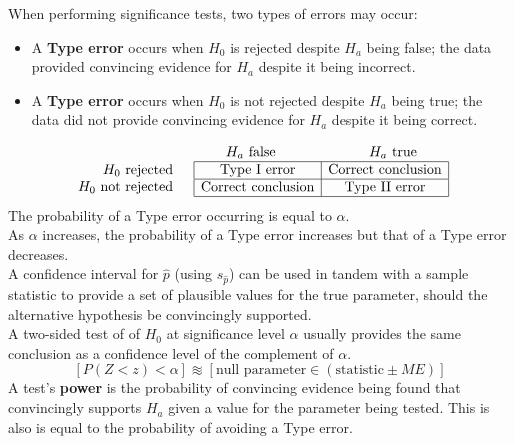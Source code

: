 \documentclass[../AP_Statistics.tex]{subfiles}
\begin{document}
		When performing significance tests, two types of errors may occur:
		\begin{itemize}
			\item
				A \textbf{Type  error} occurs when $H_0$ is rejected despite $H_a$ being false; the data provided convincing evidence for $H_a$ despite it being incorrect. 
			\item
			A \textbf{Type  error} occurs when $H_0$ is not rejected despite $H_a$ being true; the data did not provide convincing evidence for $H_a$ despite it being correct.
		\end{itemize}
		$$\begin{array}{cc}
			&\begin{array}{cc} H_a\text{ false} &\hspace{2cm} H_a\text{ true}\end{array} \\
			\begin{array}{r}H_0\text{ rejected} \\ H_0\text{ not rejected}\end{array} &
			\begin{array}{|c|c|}\hline
				\text{Type \Roman{1} error} & \text{Correct conclusion} \\\hline
				\text{Correct conclusion} & \text{Type \Roman{2} error} \\\hline
			\end{array}
		\end{array}$$
		The probability of a Type  error occurring is equal to $\alpha$. \\
		As $\alpha$ increases, the probability of a Type  error increases but that of a Type  error decreases. \\
		A confidence interval for $\hat{p}$ (using $s_{\hat{p}}$) can be used in tandem with a sample statistic to provide a set of plausible values for the true parameter, should the alternative hypothesis be convincingly supported. \\
		A two-sided test of of $H_0$ at significance level $\alpha$ usually provides the same conclusion as a confidence level of the complement of $\alpha$.
		$$[P(Z < z) < \alpha] \approxident [\text{null parameter} \in (\text{statistic} \pm ME)]$$
		A test's \textbf{power} is the probability of convincing evidence being found that convincingly supports $H_a$ given a value for the parameter being tested. This is also is equal to the probability of avoiding a Type  error. 
\end{document}
